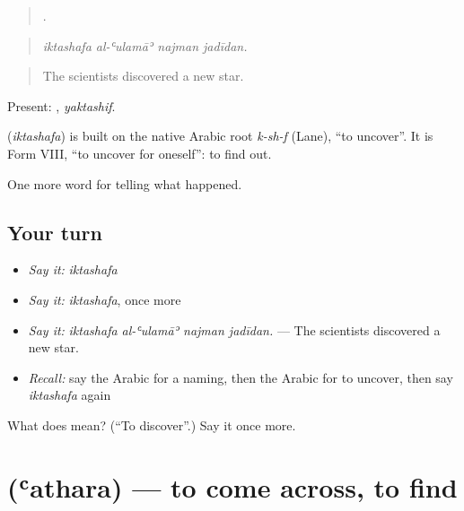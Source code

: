 \begin{quote}
   .
\end{quote}

\begin{quote}
\emph{iktashafa al-ʿulamāʾ najman jadīdan.}
\end{quote}

\begin{quote}
The scientists discovered a new star.
\end{quote}

Present: , \emph{yaktashif}.

\begin{cousinweb}
\textbf{} (\emph{iktashafa}) is built on the native Arabic root \emph{k-sh-f} (Lane), \textquotedblleft{}to uncover\textquotedblright{}. It is Form VIII, \textquotedblleft{}to uncover for oneself\textquotedblright{}: to find out.
\end{cousinweb}

\begin{grammarlens}[title={What you've built}]
One more word for telling what happened.
\end{grammarlens}

\subsection*{Your turn}
\begin{itemize}
\raggedright
  \item \emph{Say it:} \emph{iktashafa}
  \item \emph{Say it:} \emph{iktashafa}, once more
  \item \emph{Say it:} \emph{iktashafa al-ʿulamāʾ najman jadīdan.} — The scientists discovered a new star.
  \item \emph{Recall:} say the Arabic for a naming, then the Arabic for to uncover, then say \emph{iktashafa} again
\end{itemize}

\begin{tcolorbox}[breakable,colback=teal!4,colframe=teal!35!black,title={Before you move on}]
What does  mean? (\textquotedblleft{}To discover\textquotedblright{}.) Say it once more.
\end{tcolorbox}
\section[\texorpdfstring{\ar{عثر} (ʿathara)}{عثر (ʿathara)}]{ (ʿathara) — to come across, to find}

